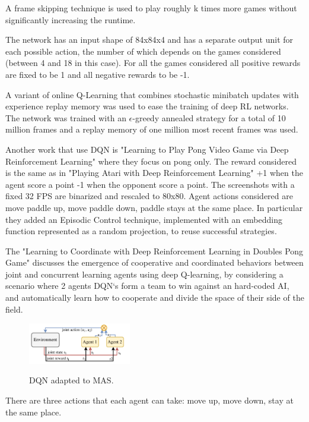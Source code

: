 A frame skipping technique is used to play roughly k times more games without significantly increasing the runtime.

The network has an input shape of 84x84x4 and has a separate output unit for each possible action, the number of which depends on the games considered (between 4 and 18 in this case).
For all the games considered all positive rewards are fixed to be 1 and all negative rewards to be -1.

A variant of online Q-Learning that combines stochastic minibatch updates with experience replay memory was used to ease the training of deep RL networks.
The network was trained with an $\epsilon$-greedy annealed strategy for a total of 10 million frames and a replay memory of one million most recent frames was used.




Another work that use DQN is "Learning to Play Pong Video Game via Deep Reinforcement Learning" where they focus on pong only.
The reward considered is the same as in "Playing Atari with Deep Reinforcement Learning" +1 when the agent score a point -1 when the opponent score a point.
The screenshots with a fixed 32 FPS are binarized and rescaled to 80x80.
Agent actions considered are move paddle up, move paddle down, paddle stays at the same place.
In particular they added an Episodic Control technique, implemented with an embedding function represented as a random projection, to reuse successful strategies.




The "Learning to Coordinate with Deep Reinforcement Learning in Doubles Pong Game" discusses the emergence of cooperative and coordinated behaviors between joint and concurrent learning
agents using deep Q-learning, by considering a scenario where 2 agents DQN`s form a team to win against an hard-coded AI,
and automatically learn how to cooperate and divide the space of their side of the field.

\begin{figure}[ht]
    \centering
    \includegraphics[width=0.4\textwidth]{images/DQN_MAS.png}
    \label{dqnmas}
    \caption{DQN adapted to MAS.}
\end{figure}

There are three actions that each agent can take: move up, move down, stay at the same place.

